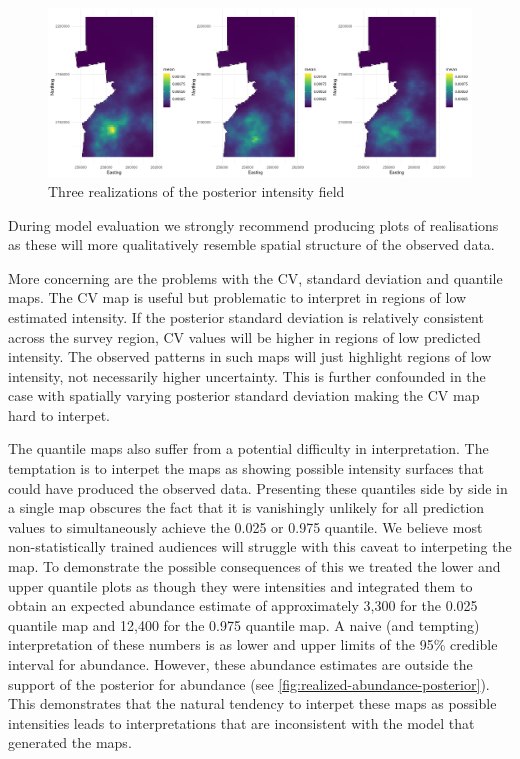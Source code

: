 \documentclass[preprint,12pt]{elsarticle}
\begin{document}
\begin{figure}
	\includegraphics[scale=0.35]{figures/intensity_realized.png}
	\caption{Three realizations of the posterior intensity field}
	\label{fig:intensity-realizations}
\end{figure}

During model evaluation we strongly recommend producing plots of realisations as these will more qualitatively resemble spatial structure of the observed data.  

More concerning are the problems with the CV, standard deviation and quantile maps.  The CV map is useful but problematic to interpret in regions of low estimated intensity.  If the posterior standard deviation is relatively consistent across the survey region, CV values will be higher in regions of low predicted intensity.  The observed patterns in such maps will just highlight regions of low intensity, not necessarily higher uncertainty.  This is further confounded in the case with spatially varying posterior standard deviation making the CV map hard to interpet.

The quantile maps also suffer from a potential difficulty in interpretation. The temptation is to interpet the maps as showing possible intensity surfaces that could have produced the observed data.  Presenting these quantiles side by side in a single map obscures the fact that it is vanishingly unlikely for all prediction values to simultaneously achieve the 0.025 or 0.975 quantile.  We believe most non-statistically trained audiences will struggle with this caveat to interpeting the map.  To demonstrate the possible consequences of this we treated the lower and upper quantile plots as though they were intensities and integrated them to obtain an expected abundance estimate of approximately 3,300 for the 0.025 quantile map and 12,400 for the 0.975 quantile map.  A naive (and tempting) interpretation of these numbers is as lower and upper limits of the 95\% credible interval for abundance. However, these abundance estimates are outside the support of the posterior for abundance (see \autoref{fig:realized-abundance-posterior}).  This demonstrates that the natural tendency to interpet these maps as possible intensities leads to interpretations that are inconsistent with the model that generated the maps.
\end{document}
